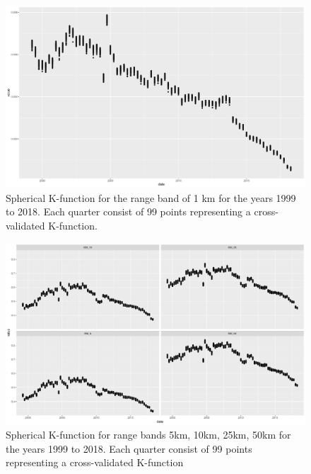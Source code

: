 \begin{figure}[H]
	\centering
	\includegraphics[width=.9\textwidth]{Figures/ChapterIII/Cross_Val_1k.pdf} 
	\caption[Spherical K-function for Range Band 1km]{Spherical K-function for the range band of 1 km for the years 1999 to 2018.  Each quarter consist of 99 points representing a cross-validated K-function.}
	\label{fig:Kfunction1}
\end{figure}

\begin{figure}[H]
	\centering
	\includegraphics[width=.9\textwidth]{Figures/ChapterIII/K_Function_5to50.pdf} 
	\caption[Spherical K-function for Range Bands 5km to 50km]{Spherical K-function for range bands 5km, 10km, 25km, 50km for the years 1999 to 2018. Each quarter consist of 99 points representing a cross-validated K-function}
	\label{fig:Kfunction5to100}
\end{figure}

